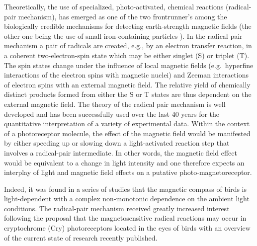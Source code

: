\documentclass[twoside,twocolumn,9pt]{article}
\begin{document}
Theoretically, the use of specialized, photo-activated, chemical reactions (radical-pair mechanism), has emerged as one of the two 
frontrunner's among the biologically credible mechanisms for detecting earth-strength magnetic fields (the other one being the use 
of small iron-containing particles \cite{Kirschvink1981}). In the radical pair mechanism \cite{Schulten1978} a pair of radicals 
are created, e.g., by an electron transfer reaction, in a coherent two-electron-spin state which may be either singlet (S) or 
triplet (T). The spin states change under the influence of local magnetic fields (e.g.\ hyperfine interactions of the electron 
spins with magnetic nuclei) and Zeeman interactions of electron spins with an external magnetic field. The relative yield of 
chemically distinct products formed from either the S or T states are thus dependent on the external magnetic field. The theory of 
the radical pair mechanism is well developed and has been successfully used over the last 40 years for the quantitative 
interpretation of a variety of experimental data. Within the context of a photoreceptor molecule, the effect of the magnetic field 
would be manifested by either speeding up or slowing down a light-activated reaction step that involves a radical-pair 
intermediate. In other words, the magnetic field effect would be equivalent to a change in light intensity and one therefore 
expects an interplay of light and magnetic field effects on a putative photo-magnetoreceptor.

Indeed, it was found in a series of studies that the magnetic compass of birds is light-dependent with a complex non-monotonic 
dependence on the ambient light conditions. \cite{Johnsen2007, Wiltschko2016, Wiltschko2008} The radical-pair mechanism received 
greatly increased interest following the proposal that the magnetosensitive radical reactions may occur in cryptochrome (Cry) 
photoreceptors located in the eyes of birds \cite{Ritz2000} with an overview of the current state of research recently published.
\cite{Hore2016} 
\end{document}
